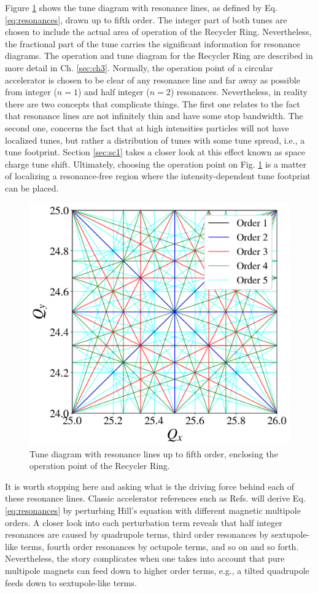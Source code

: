 Figure \ref{fig:tunediagram} shows the tune diagram with resonance lines, as defined by Eq. \ref{eq:resonances}, drawn up to fifth order. The integer part of both tunes are chosen to include the actual area of operation of the Recycler Ring. Nevertheless, the fractional part of the tune carries the significant information for resonance diagrams. The operation and tune diagram for the Recycler Ring are described in more detail in Ch. \ref{sec:ch3}. Normally, the operation point of a circular accelerator is chosen to be clear of any resonance line and far away as possible from integer ($n=1$) and half integer ($n=2$) resonances. Nevertheless, in reality there are two concepts that complicate things. The first one relates to the fact that resonance lines are not infinitely thin and have some stop bandwidth. The second one, concerns the fact that at high intensities particles will not have localized tunes, but rather a distribution of tunes with some tune spread, i.e., a tune footprint. Section \ref{sec:sc1} takes a closer look at this effect known as space charge tune shift. Ultimately, choosing the operation point on Fig. \ref{fig:tunediagram} is a matter of localizing a resonance-free region where the intensity-dependent tune footprint can be placed.   
\begin{figure}[H]
    \centering
    \includegraphics[width=0.8\columnwidth]{chapter2/tunediagram.png}
    \caption{Tune diagram with resonance lines up to fifth order, enclosing the operation point of the Recycler Ring.}
    \label{fig:tunediagram}
 \end{figure}
It is worth stopping here and asking what is the driving force behind each of these resonance lines. Classic accelerator references such as Refs. \cite{wolski,Wiedemann2015,sylee} will derive Eq. \ref{eq:resonances} by perturbing Hill's equation with different magnetic multipole orders. A closer look into each perturbation term reveals that half integer resonances are caused by quadrupole terms, third order resonances by sextupole-like terms, fourth order resonances by octupole terms, and so on and so forth. Nevertheless, the story complicates when one takes into account that pure multipole magnets can feed down to higher order terms, e.g., a tilted quadrupole feeds down to sextupole-like terms.        

